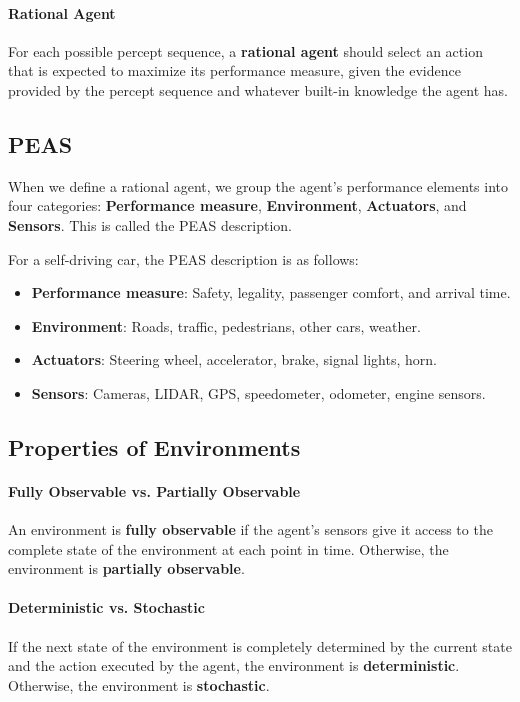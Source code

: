 \documentclass[a4paper,12pt]{article}
\begin{document}
\paragraph{Rational Agent} For each possible percept sequence, a \textbf{rational agent} should select an action that is expected to maximize its performance measure, given the evidence provided by the percept sequence and whatever built-in knowledge the agent has.

\subsection{PEAS}

When we define a rational agent, we group the agent's performance elements into four categories: \textbf{Performance measure}, \textbf{Environment}, \textbf{Actuators}, and \textbf{Sensors}. This is called the PEAS description.

\begin{examplebox}
	For a self-driving car, the PEAS description is as follows:
	\begin{itemize}
		\item \textbf{Performance measure}: Safety, legality, passenger comfort, and arrival time.
		\item \textbf{Environment}: Roads, traffic, pedestrians, other cars, weather.
		\item \textbf{Actuators}: Steering wheel, accelerator, brake, signal lights, horn.
		\item \textbf{Sensors}: Cameras, LIDAR, GPS, speedometer, odometer, engine sensors.
	\end{itemize}
\end{examplebox}

\subsection{Properties of Environments}

\paragraph{Fully Observable vs. Partially Observable} An environment is \textbf{fully observable} if the agent's sensors give it access to the complete state of the environment at each point in time. Otherwise, the environment is \textbf{partially observable}.

\paragraph{Deterministic vs. Stochastic} If the next state of the environment is completely determined by the current state and the action executed by the agent, the environment is \textbf{deterministic}. Otherwise, the environment is \textbf{stochastic}.
\end{document}
